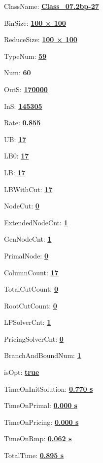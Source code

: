 \documentclass[11pt]{article}
\begin{document}
\pagestyle{empty}


ClassName: \underline{\textbf{Class_07.2bp-27}}
\par
BinSize: \underline{\textbf{100 × 100}}
\par
ReduceSize: \underline{\textbf{100 × 100}}
\par
TypeNum: \underline{\textbf{59}}
\par
Num: \underline{\textbf{60}}
\par
OutS: \underline{\textbf{170000}}
\par
InS: \underline{\textbf{145305}}
\par
Rate: \underline{\textbf{0.855}}
\par
UB: \underline{\textbf{17}}
\par
LB0: \underline{\textbf{17}}
\par
LB: \underline{\textbf{17}}
\par
LBWithCut: \underline{\textbf{17}}
\par
NodeCut: \underline{\textbf{0}}
\par
ExtendedNodeCnt: \underline{\textbf{1}}
\par
GenNodeCnt: \underline{\textbf{1}}
\par
PrimalNode: \underline{\textbf{0}}
\par
ColumnCount: \underline{\textbf{17}}
\par
TotalCutCount: \underline{\textbf{0}}
\par
RootCutCount: \underline{\textbf{0}}
\par
LPSolverCnt: \underline{\textbf{1}}
\par
PricingSolverCnt: \underline{\textbf{0}}
\par
BranchAndBoundNum: \underline{\textbf{1}}
\par
isOpt: \underline{\textbf{true}}
\par
TimeOnInitSolution: \underline{\textbf{0.770 s}}
\par
TimeOnPrimal: \underline{\textbf{0.000 s}}
\par
TimeOnPricing: \underline{\textbf{0.000 s}}
\par
TimeOnRmp: \underline{\textbf{0.062 s}}
\par
TotalTime: \underline{\textbf{0.895 s}}
\par
\newpage


\end{document}
